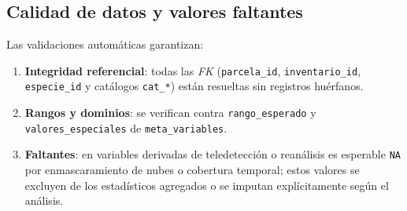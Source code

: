 \subsection*{Calidad de datos y valores faltantes}

Las validaciones automáticas garantizan:
\begin{enumerate}
  \item \textbf{Integridad referencial}: todas las \textit{FK} (\texttt{parcela\_id}, \texttt{inventario\_id}, \texttt{especie\_id} y catálogos \texttt{cat\_*}) están resueltas sin registros huérfanos.
  \item \textbf{Rangos y dominios}: se verifican contra \texttt{rango\_esperado} y \texttt{valores\_especiales} de \texttt{meta\_variables}.
  \item \textbf{Faltantes}: en variables derivadas de teledetección o reanálisis es esperable \texttt{NA} por enmascaramiento de nubes o cobertura temporal; estos valores se excluyen de los estadísticos agregados o se imputan explícitamente según el análisis.
\end{enumerate}
